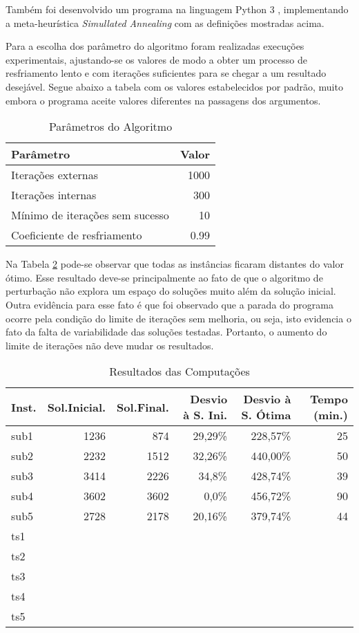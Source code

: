 \documentclass{article}
\begin{document}
Também foi desenvolvido um programa na linguagem Python 3 \cite{PYTHON}, implementando a meta-heurística \emph{Simullated Annealing} com as definições mostradas acima.

Para a escolha dos parâmetro do algoritmo foram realizadas execuções experimentais, ajustando-se os valores de modo a obter um processo de resfriamento lento e com iterações suficientes para se chegar a um resultado desejável. Segue abaixo a tabela com os valores estabelecidos por padrão, muito embora o programa aceite valores diferentes na passagens dos argumentos.

\begin{table}[H]
\centering
\begin{tabular}{|l | r |}
	\hline
	\textbf{Parâmetro} & \textbf{Valor} \\ \hline
	Iterações externas		& 1000	\\ \hline
	Iterações internas		& 300	\\ \hline
	Mínimo de iterações sem sucesso	& 10 	\\ \hline
	Coeficiente de resfriamento		& 0.99	\\ \hline
\end{tabular}
\label{tab:Parametros}
\caption{Parâmetros do Algoritmo}
\end{table}

Na Tabela \ref{tab:Resultado} pode-se observar que todas as instâncias ficaram distantes do valor ótimo. Esse resultado deve-se principalmente ao fato de que o algoritmo de perturbação não explora um espaço do soluções muito além da solução inicial. Outra evidência para esse fato é que foi observado que a parada do programa ocorre pela condição do limite de iterações sem melhoria, ou seja, isto evidencia o fato da falta de variabilidade das soluções testadas. Portanto, o aumento do limite de iterações não deve mudar os resultados.

\begin{table}[H]
\centering
\begin{tabular}{|l | r | r | r | r | r|}
	\hline
	\textbf{Inst.} & \textbf{Sol.Inicial.} & \textbf{Sol.Final.} & \textbf{Desvio à S. Ini.} & \textbf{Desvio à S. Ótima} & \textbf{Tempo (min.)} \\ \hline
	sub1	& 1236	& 874	& 29,29\%	& 228,57\%	& 25	\\ \hline
	sub2	& 2232	& 1512	& 32,26\%	& 440,00\%	& 50	\\ \hline
	sub3	& 3414	& 2226	& 34,8\%	& 428,74\%	& 39	\\ \hline
	sub4	& 3602	& 3602 	& 0,0\%		& 456,72\%	& 90	\\ \hline
	sub5	& 2728	& 2178	& 20,16\%	& 379,74\%	& 44	\\ \hline
	ts1		& 	& 	& 	& 	& 	\\ \hline
	ts2		& 	& 	& 	& 	& 	\\ \hline
	ts3		& 	& 	& 	& 	& 	\\ \hline
	ts4		& 	& 	& 	& 	& 	\\ \hline
	ts5		& 	& 	& 	& 	& 	\\ \hline
\end{tabular}
\label{tab:Resultado}
\caption{Resultados das Computações}
\end{table}
\end{document}
